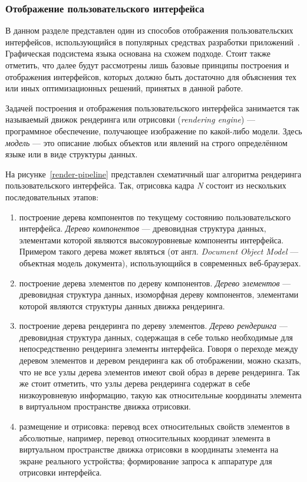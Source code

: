 \newpage
\subsubsection{Отображение пользовательского интерфейса}
В данном разделе представлен один из способов
отображения пользовательских интерфейсов, использующийся в популярных
средствах разработки приложений~\cite{flutter-homepage,swift-homepage,
vuenative-homepage,reactnative-homepage}. Графическая подсистема
языка  основана на схожем подходе. Стоит также отметить, что
далее будут рассмотрены лишь базовые принципы построения и отображения
интерфейсов, которых должно быть достаточно для объяснения тех или иных
оптимизационных решений, принятых в данной работе.

Задачей построения и отображения пользовательского интерфейса занимается
так называемый движок рендеринга или отрисовки (\textit{ren\-dering engine})
--- программное обеспечение, получающее изображение по какой-либо модели.
Здесь \textit{модель} --- это описание любых объектов или явлений на строго
определённом языке или в виде структуры данных.

На рисунке~\ref{render-pipeline} представлен схематичный шаг алгоритма
рендеринга пользовательского интерфейса. Так, отрисовка кадра \textit{N}
состоит из нескольких последовательных этапов:
\begin{enumerate}
	\item построение дерева компонентов по текущему состоянию
	пользовательского интерфейса. \textit{Дерево компонентов} ---
	древовидная структура данных, элементами которой являются
	высокоуровневые компоненты интерфейса. Примером такого дерева
	может являться  (от англ. \textit{Document Object Model} ---
	объектная модель документа), использующийся в современных веб-браузерах.
	\item построение дерева элементов по дереву компонентов. \textit{Дерево
	элементов} --- древовидная структура данных, изоморфная дереву
	компонентов, элементами которой являются структуры данных движка
	рендеринга.
	\item построение дерева рендеринга по дереву элементов. \textit{Дерево
	рендеринга} --- древовидная структура данных, содержащая в себе только
	необходимые для непосредственно рендеринга элементы интерфейса. Говоря
	о переходе между деревом элементов и деревом рендеринга как об
	отображении, можно сказать, что не все узлы дерева элементов имеют
	свой образ в дереве рендеринга. Так же стоит отметить, что узлы дерева
	рендеринга содержат в себе низкоуровневую информацию, такую как
	относительные координаты элемента в виртуальном пространстве движка
	отрисовки.
	\item размещение и отрисовка: перевод всех относительных свойств
	элементов в абсолютные, например, перевод относительных координат
	элемента в виртуальном пространстве движка отрисовки в координаты
	элемента на экране реального устройства; формирование запроса к
	аппаратуре для отрисовки интерфейса.
\end{enumerate}

